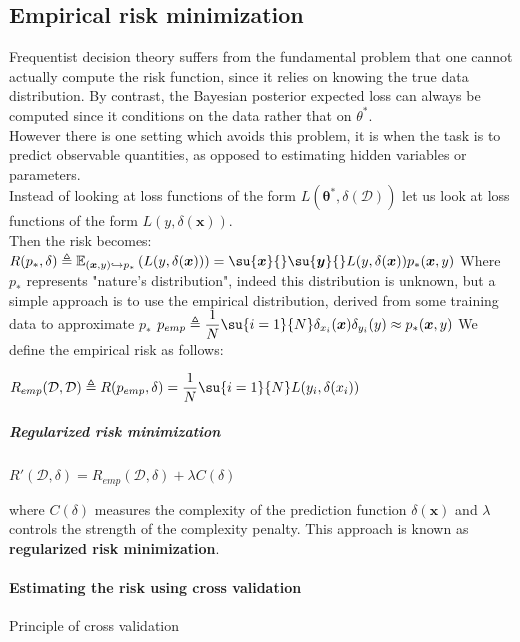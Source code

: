 \subsection{Empirical risk minimization}
Frequentist decision theory suffers from the fundamental problem that one cannot actually
compute the risk function, since it relies on knowing the true data distribution. By
contrast, the Bayesian posterior expected loss can always be computed since it conditions
on the data rather that on $\theta^{*}$.\\
However there is one setting which avoids this problem, it is when the task is to predict
observable quantities, as opposed to estimating hidden variables or parameters.\\
Instead of looking at loss functions of the form $L(\bm{\theta^{*}}, \delta(\mathcal{D}))$
let us look at loss functions of the form $L(y, \delta(\bm{x}))$.\\
Then the risk becomes:
$R(p_{*}, \delta) \triangleq \mathbb{E}_{(\bm{x}, y)\hookrightarrow p_{*}}\left(L(y,
\delta(\bm{x}))\right) = \su{\bm{x}}{}\su{\bm{y}}{}L(y, \delta(\bm{x}))p_{*}(\bm{x}, y)$
Where $p_{*}$ represents "nature's distribution", indeed this distribution is unknown, 
but a simple approach is to use the empirical distribution, derived from some training 
data to approximate $p_{*}$
$p_{emp} \triangleq \dfrac{1}{N}\su{i=1}{N}\delta_{x_{i}}(\bm{x})\delta_{y_{i}}(y) 
\approx p_{*}(\bm{x}, y)$
We define the empirical risk as follows:
\begin{center}
    $R_{emp}(\mathcal{D}, \mathcal{D}) \triangleq R(p_{emp}, \delta) = \dfrac{1}{N}
    \su{i=1}{N}L(y_{i}, \delta(x_{i}))$
\end{center}
\subparagraph{Regularized risk minimization}
\begin{center}
    $R'(\mathcal{D}, \delta) = R_{emp}(\mathcal{D}, \delta) + \lambda C(\delta)$
\end{center}
where $C(\delta)$ measures the complexity of the prediction function $\delta(\bm{x})$ and 
$\lambda$ controls the strength of the complexity penalty. 
This approach is known as \textbf{regularized risk minimization}.

\paragraph{Estimating the risk using cross validation}
Principle of cross validation













